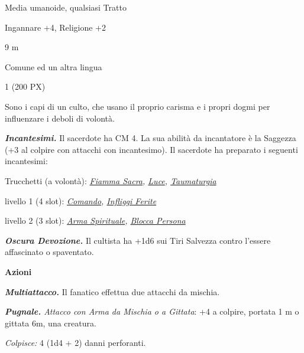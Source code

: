 \begin{multicols}{2}
{
\begin{description}[noitemsep, topsep=0pt, parsep=0pt, partopsep=0pt, itemsep=1pt, leftmargin=2.35cm,  labelwidth=2.2cm, itemindent=0cm, listparindent=0pt] %
\setlength{\baselineskip}{10pt}
\item[\textbf{Taglia/Tipo}] Media umanoide, qualsiasi Tratto
\item[\textbf{Caratt.}] 
\item[\textbf{Punti Ferita}] 
\item[\textbf{Comp.}] Ingannare +4, Religione +2
\item[\textbf{Tiri Salvez.}] 
\item[\textbf{Movimento}] 9 m
\item[\textbf{Linguaggi}] Comune ed un altra lingua
\item[\textbf{Sfida}] 1 (200 PX)
\end{description}
\smallskip

Sono i capi di un culto, che usano il proprio carisma e i propri dogmi per influenzare i deboli di volontà.

\emph{\textbf{Incantesimi.}} Il sacerdote ha CM 4. La sua abilità da incantatore è la Saggezza (+3 al colpire con attacchi con incantesimo). Il sacerdote ha preparato i seguenti incantesimi:

Trucchetti (a volontà): \emph{\hyperlink{Fiamma Sacra}{Fiamma Sacra}, \hyperlink{Luce}{Luce}, \hyperlink{Taumaturgia}{Taumaturgia}}

livello 1 (4 slot): \emph{\hyperlink{Comando}{Comando}, \hyperlink{Infliggi Ferite}{Infliggi Ferite}}

livello 2 (3 slot): \emph{\hyperlink{Arma Spirituale}{Arma Spirituale}, \hyperlink{Blocca Persona}{Blocca Persona}}

\emph{\textbf{Oscura Devozione.}} Il cultista ha +1d6 sui Tiri Salvezza contro l'essere affascinato o spaventato.

\textbf{Azioni}

\emph{\textbf{Multiattacco.}} Il fanatico effettua due attacchi da mischia.

\emph{\textbf{Pugnale.} Attacco con Arma da Mischia o a Gittata}: +4 a colpire, portata 1 m o gittata 6m, una creatura.

\emph{Colpisce:} 4 (1d4 + 2) danni perforanti.

}
\end{multicols}
